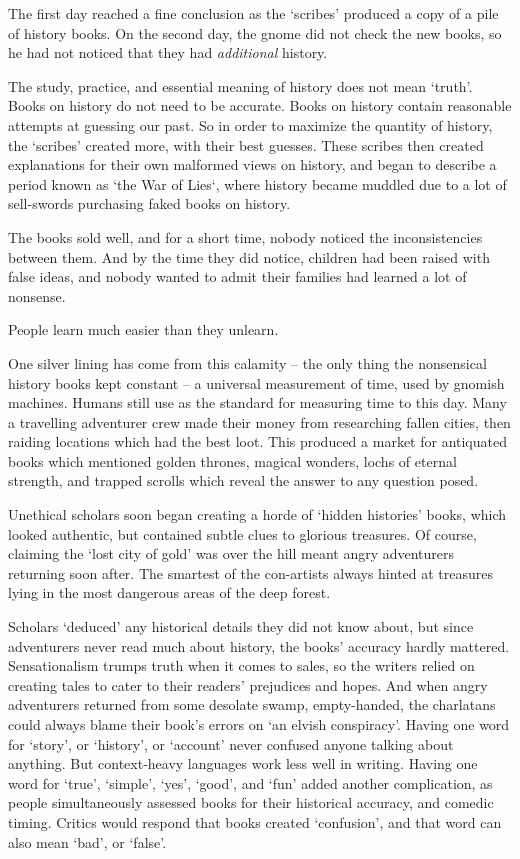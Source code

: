 \begin{multicols}{2}
\begin{exampletext}
  The first day reached a fine conclusion as the `scribes' produced a copy of a pile of history books.
  On the second day, the gnome did not check the new books, so he had not noticed that they had \emph{additional} history.

  The study, practice, and essential meaning of history does not mean `truth'.
  Books on history do not need to be accurate.
  Books on history contain reasonable attempts at guessing our past.
  So in order to maximize the quantity of history, the `scribes' created more, with their best guesses.
  These scribes then created explanations for their own malformed views on history, and began to describe a period known as `the War of Lies`, where history became muddled due to a lot of sell-swords purchasing faked books on history.

  The books sold well, and for a short time, nobody noticed the inconsistencies between them.
  And by the time they did notice, children had been raised with false ideas, and nobody wanted to admit their families had learned a lot of nonsense.

  People learn much easier than they unlearn.

    One silver lining has come from this calamity -- the only thing the nonsensical history books kept constant -- a universal measurement of time, used by gnomish machines.
    Humans still use  as the standard for measuring time to this day.
  \or
    Many a travelling adventurer crew made their money from researching fallen cities, then raiding locations which had the best loot.
    This produced a market for antiquated books which mentioned golden thrones, magical wonders, lochs of eternal strength, and trapped scrolls which reveal the answer to any question posed.

    Unethical scholars soon began creating a horde of `hidden histories' books, which looked authentic, but contained subtle clues to glorious treasures.
    Of course, claiming the `lost city of gold' was over the hill meant angry adventurers returning soon after.
    The smartest of the con-artists always hinted at treasures lying in the most dangerous areas of the deep forest.

    Scholars `deduced' any historical details they did not know about, but since adventurers never read much about history, the books' accuracy hardly mattered.
    Sensationalism trumps truth when it comes to sales, so the writers relied on creating tales to cater to their readers' prejudices and hopes.
    And when angry adventurers returned from some desolate swamp, empty-handed, the charlatans could always blame their book's errors on `an elvish conspiracy'.
  \else
    Having one word for `story', or `history', or `account' never confused anyone talking about anything.
    But context-heavy languages work less well in writing.
    Having one word for `true', `simple', `yes', `good', and `fun' added another complication, as people simultaneously assessed books for their historical accuracy, and comedic timing.
    Critics would respond that books created `confusion', and that word can also mean `bad', or `false'.


\end{exampletext}
\end{multicols}
